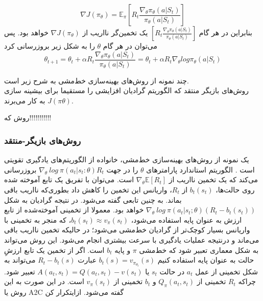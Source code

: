 $$\nabla J(\pi_\theta) = \mathbb{E}_\pi \left[ R_t \frac{\nabla_\theta \pi_\theta (a|S_t)}{\pi_\theta (a|S_t)} \right]$$
بنابراین در هر گام
$\left[ R_t \frac{\nabla_\theta \pi_\theta (a|S_t)}{\pi_\theta (a|S_t)} \right]$
یک تخمین‌گر نااریب از $\nabla J(\pi_\theta)$ خواهد بود\cite{suttonbook}. پس می‌توان در هر گام $\theta$ را به شکل زیر بروزرسانی کرد
$$\theta_{t+1} = \theta_t + \alpha R_t \frac{\nabla_\theta \pi_\theta (a|S_t)}{\pi_\theta (a|S_t)} = \theta_t + \alpha R_t \nabla_\theta log \pi_\theta (a|S_t)$$

چند نمونه از روش‌های بهینه‌سازی خط‌مشی به شرح زیر است. \\
روش‌های بازیگر منتقد
  که الگوریتم 
 گرادیان افزایشی
   را مستقیما برای بیشینه سازی 
$J(\pi\theta)$
به کار می‌برند.

روش  
 که!!!!!!!!!!!

\subsubsection{روش‌های بازیگر-منتقد}
یک نمونه از روش‌های بهینه‌سازی خط‌مشی، خانواده
 از الگوریتم‌های یادگیری تقویتی است
\cite{williams1992simple}.
الگوریتم استاندارد  پارامترهای $\theta$ را در جهت 
 $\nabla_\theta \  log  \ \pi (a_t|s_t:\theta)R_t$ بروزرسانی می‌کند که یک تخمین نااریب از
   $\nabla_\theta \mathbb{E}[R_t]$
است. می‌توان  با تفریق یک تابع آموخته شده روی حالت‌ها، 
$b_t(s_t)$
از 
$R_t$، واریانس این تخمین را کاهش داد بطوری‌که نااریب باقی بماند. به چنین تابعی  گفته می‌شود. در نتیجه گرادیان به شکل
$\nabla_\theta \ log \ \pi(a_t|s_t;\theta) (R_t - b_t(s_t))$
خواهد بود. معمولا از تخمینی آموخته‌شده از تابع ارزش به عنوان پایه استفاده می‌شود،
$b_t(s_t) \approx v_\pi (s_t)$،
 که منجر به تخمینی با واریانس بسیار کوچک‌تر از گرادیان خط‌مشی می‌\nf شود؛ در حالیکه تخمین نااریب باقی می‌ماند و درنتیجه عملیات یادگیری با سرعت بیشتری انجام می‌شود.
این روش می‌تواند به شکل معماری   تعبیر شود که خط‌مشی $\pi$  و پایه $b_t$  است. اگر از تخمین یک تابع ارزشِ حالت به عنوان پایه استفاده کنیم 
$b_t(s) = v_{\pi_{\theta_t}}(s)$ عبارت $R_t - b_t(s)$ می‌تواند به شکل تخمینی از   عمل $a_t$ در حالت $s_t$ یا 
$A(a_t,s_t)=Q(a_t,s_t)-v(s_t)$ تعبیر شود. چراکه $R_t$ تخمینی از  $Q_\pi (a_t, s_t)$ و $b_t$ تخمینی از  $v_\pi (s_t)$ است. در این صورت به این روش 
 یا A2C گفته می‌شود.
‌ازای{تکرار کن}

